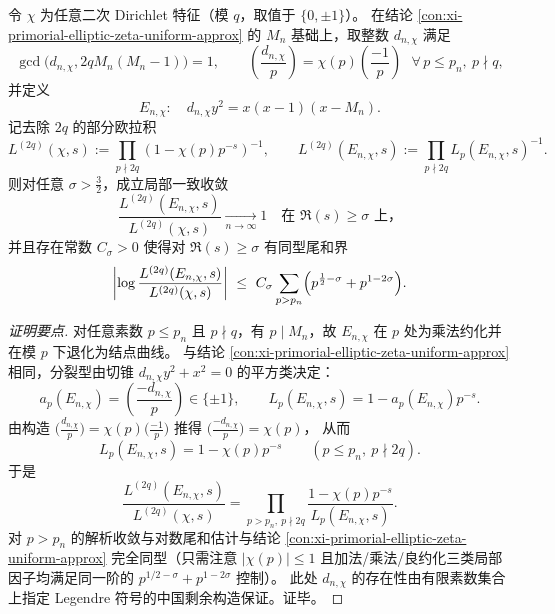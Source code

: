 \begin{conclusion}\label{con:xi-primorial-quadratic-dirichlet-elliptic-approx}
令 \(\chi\) 为任意二次 Dirichlet 特征（模 \(q\)，取值于 \(\{0,\pm1\}\)）。
在结论 \ref{con:xi-primorial-elliptic-zeta-uniform-approx} 的 \(M_n\) 基础上，取整数 \(d_{n,\chi}\) 满足
\[
\gcd\!\bigl(d_{n,\chi},2qM_n(M_n-1)\bigr)=1,
\qquad
\left(\frac{d_{n,\chi}}{p}\right)=\chi(p)\left(\frac{-1}{p}\right)\ \ \ \forall\,p\le p_n,\ p\nmid q,
\]
并定义
\[
E_{n,\chi}:\quad d_{n,\chi}y^2=x(x-1)(x-M_n).
\]
记去除 \(2q\) 的部分欧拉积
\[
L^{(2q)}(\chi,s):=\prod_{p\nmid 2q}(1-\chi(p)p^{-s})^{-1},
\qquad
L^{(2q)}(E_{n,\chi},s):=\prod_{p\nmid 2q} L_p(E_{n,\chi},s)^{-1}.
\]
则对任意 \(\sigma>\tfrac32\)，成立局部一致收敛
\[
\frac{L^{(2q)}(E_{n,\chi},s)}{L^{(2q)}(\chi,s)}\xrightarrow[n\to\infty]{}1
\quad\text{在 }\Re(s)\ge\sigma\text{ 上，}
\]
并且存在常数 \(C_\sigma>0\) 使得对 \(\Re(s)\ge\sigma\) 有同型尾和界
\[
\left|\log\frac{L^{(2q)}(E_{n,\chi},s)}{L^{(2q)}(\chi,s)}\right|
\ \le\
C_\sigma\sum_{p>p_n}\Bigl(p^{\frac12-\sigma}+p^{1-2\sigma}\Bigr).
\]
\end{conclusion}
\begin{proof}[证明要点]
对任意素数 \(p\le p_n\) 且 \(p\nmid q\)，有 \(p\mid M_n\)，故 \(E_{n,\chi}\) 在 \(p\) 处为乘法约化并在模 \(p\) 下退化为结点曲线。
与结论 \ref{con:xi-primorial-elliptic-zeta-uniform-approx} 相同，分裂型由切锥 \(d_{n,\chi}y^2+x^2=0\) 的平方类决定：
\[
a_p(E_{n,\chi})=
\left(\frac{-d_{n,\chi}}{p}\right)
\in\{\pm1\},
\qquad
L_p(E_{n,\chi},s)=1-a_p(E_{n,\chi})p^{-s}.
\]
由构造 \(\bigl(\frac{d_{n,\chi}}{p}\bigr)=\chi(p)\bigl(\frac{-1}{p}\bigr)\) 推得
\(
\bigl(\frac{-d_{n,\chi}}{p}\bigr)=\chi(p)
\)，
从而
\[
L_p(E_{n,\chi},s)=1-\chi(p)p^{-s}\qquad(p\le p_n,\ p\nmid 2q).
\]
于是
\[
\frac{L^{(2q)}(E_{n,\chi},s)}{L^{(2q)}(\chi,s)}
=\prod_{p>p_n,\ p\nmid 2q}\frac{1-\chi(p)p^{-s}}{L_p(E_{n,\chi},s)}.
\]
对 \(p>p_n\) 的解析收敛与对数尾和估计与结论 \ref{con:xi-primorial-elliptic-zeta-uniform-approx} 完全同型（只需注意 \(|\chi(p)|\le 1\) 且加法/乘法/良约化三类局部因子均满足同一阶的 \(p^{1/2-\sigma}+p^{1-2\sigma}\) 控制）。
此处 \(d_{n,\chi}\) 的存在性由有限素数集合上指定 Legendre 符号的中国剩余构造保证。证毕。
\end{proof}

